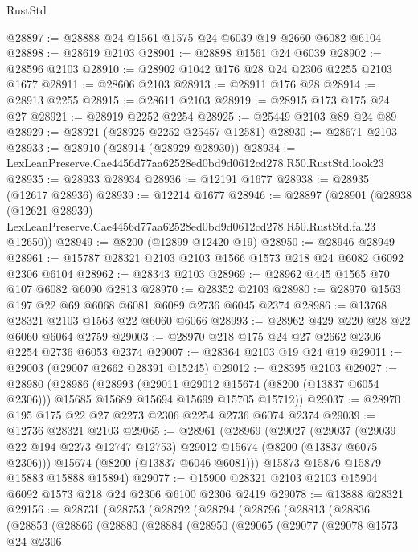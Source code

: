 \begin{lexlean}{RustStd}
\begin{coremodule}
@28897 := @28888 @24 @1561 @1575 @24 @6039 @19 @2660 @6082 @6104
@28898 := @28619 @2103
@28901 := @28898 @1561 @24 @6039
@28902 := @28596 @2103
@28910 := @28902 @1042 @176 @28 @24 @2306 @2255 @2103 @1677
@28911 := @28606 @2103
@28913 := @28911 @176 @28
@28914 := @28913 @2255
@28915 := @28611 @2103
@28919 := @28915 @173 @175 @24 @27
@28921 := @28919 @2252 @2254
@28925 := @25449 @2103 @89 @24 @89
@28929 := @28921 (@28925 @2252 @25457 @12581)
@28930 := @28671 @2103
@28933 := @28910 (@28914 (@28929 @28930))
@28934 := LexLeanPreserve.Cae4456d77aa62528ed0bd9d0612cd278.R50.RustStd.look23
@28935 := @28933 @28934
@28936 := @12191 @1677
@28938 := @28935 (@12617 @28936)
@28939 := @12214 @1677
@28946 := @28897
    (@28901
      (@28938
        (@12621 @28939)
        LexLeanPreserve.Cae4456d77aa62528ed0bd9d0612cd278.R50.RustStd.fal23
        @12650))
@28949 := @8200 (@12899 @12420 @19)
@28950 := @28946 @28949
@28961 := @15787 @28321 @2103 @2103 @1566 @1573 @218 @24 @6082 @6092 @2306 @6104
@28962 := @28343 @2103
@28969 := @28962 @445 @1565 @70 @107 @6082 @6090 @2813
@28970 := @28352 @2103
@28980 := @28970 @1563 @197 @22 @69 @6068 @6081 @6089 @2736 @6045 @2374
@28986 := @13768 @28321 @2103 @1563 @22 @6060 @6066
@28993 := @28962 @429 @220 @28 @22 @6060 @6064 @2759
@29003 := @28970 @218 @175 @24 @27 @2662 @2306 @2254 @2736 @6053 @2374
@29007 := @28364 @2103 @19 @24 @19
@29011 := @29003 (@29007 @2662 @28391 @15245)
@29012 := @28395 @2103
@29027 := @28980
    (@28986
      (@28993
        (@29011 @29012 @15674 (@8200 (@13837 @6054 @2306)))
        @15685
        @15689
        @15694
        @15699
        @15705
        @15712))
@29037 := @28970 @195 @175 @22 @27 @2273 @2306 @2254 @2736 @6074 @2374
@29039 := @12736 @28321 @2103
@29065 := @28961
    (@28969
      (@29027
        (@29037 (@29039 @22 @194 @2273 @12747 @12753) @29012 @15674 (@8200 (@13837 @6075 @2306)))
        @15674
        (@8200 (@13837 @6046 @6081)))
      @15873
      @15876
      @15879
      @15883
      @15888
      @15894)
@29077 := @15900 @28321 @2103 @2103 @15904 @6092 @1573 @218 @24 @2306 @6100 @2306 @2419
@29078 := @13888 @28321
@29156 := @28731
    (@28753
      (@28792
        (@28794
          (@28796
            (@28813
              (@28836
                (@28853
                  (@28866
                    (@28880
                      (@28884
                        (@28950
                          (@29065
                            (@29077
                              (@29078
                                @1573
                                @24
                                @2306

\end{coremodule}
\end{lexlean}
